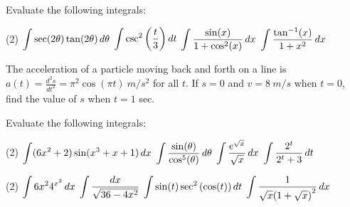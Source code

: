 \documentclass[mathNotesPreamble]{subfiles}
\begin{document}
  \begin{ex*}
    Evaluate the following integrals:
  \end{ex*}
  \begin{tasks}[after-item-skip=\stretch{1}](2)
    \task $\displaystyle\int\sec(2\theta)\tan(2\theta)\,d\theta$
    \task $\displaystyle\int\csc^2{\left(\frac{t}{3}\right)}\,dt$
    \task $\displaystyle\int \frac{\sin(x)}{1+\cos^2(x)}\,dx$
    \task $\displaystyle\int \frac{\tan^{-1}(x)}{1+x^2}\,dx$
  \end{tasks}
  
  \noindent
  The acceleration of a particle moving back and forth on a line is $a(t)=\frac{d^2s}{dt^2}=\pi^2\cos(\pi t)\ m/s^2$ for all $t$. If $s=0$ and $v=8\ m/s$ when $t=0$, find the value of $s$ when $t=1$ sec.
  \pagebreak
  
  \begin{ex*}
    Evaluate the following integrals:
  \end{ex*}
  \begin{tasks}[after-item-skip=\stretch{1}](2)
    \task $\displaystyle\int(6x^2+2)\sin(x^3+x+1)\,dx$
    \task $\displaystyle\int \frac{\sin(\theta)}{\cos^5(\theta)}\,d\theta$
    \task $\displaystyle\int \frac{e^{\sqrt{x}}}{\sqrt x}\,dx$
    \task $\displaystyle\int \frac{2^t}{2^t+3}\,dt$
  \end{tasks}
  \pagebreak
  
  \begin{tasks}[after-item-skip=\stretch{1}, resume](2)
    \task $\displaystyle\int 6x^2 4^{x^3}\,dx$
    \task $\displaystyle\int \frac{dx}{\sqrt{36-4x^2}}$
    \task $\displaystyle\int \sin(t)\sec^2{\left(\cos(t)\right)}\,dt$
    \task $\displaystyle\int \frac{1}{\sqrt{x}{\left(1+\sqrt{x}\right)}^2}\,dx$
  \end{tasks}
  \pagebreak
\end{document}
